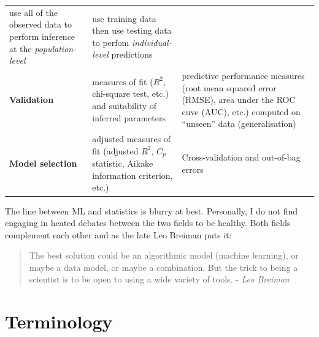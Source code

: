 \documentclass[]{book}
\begin{document}
\begin{longtable}[]{@{}lll@{}}
\begin{minipage}[t]{0.41\columnwidth}
use all of the observed data to perform inference at the \emph{population-level}\strut
\end{minipage} & \begin{minipage}[t]{0.41\columnwidth}\raggedright
use training data then use testing data to perfom \emph{individual-level} predictions\strut
\end{minipage}\tabularnewline
\begin{minipage}[t]{0.10\columnwidth}\raggedright
\textbf{Validation}\strut
\end{minipage} & \begin{minipage}[t]{0.41\columnwidth}\raggedright
measures of fit (\(R^2\), chi-square test, etc.) and suitability of inferred parameters\strut
\end{minipage} & \begin{minipage}[t]{0.41\columnwidth}\raggedright
predictive performance measures (root mean squared error (RMSE), area under the ROC cuve (AUC), etc.) computed on ``unseen'' data (generalisation)\strut
\end{minipage}\tabularnewline
\begin{minipage}[t]{0.10\columnwidth}\raggedright
\textbf{Model selection}\strut
\end{minipage} & \begin{minipage}[t]{0.41\columnwidth}\raggedright
adjusted measures of fit (adjusted \(R^2\), \(C_p\) statistic, Aikake information criterion, etc.)\strut
\end{minipage} & \begin{minipage}[t]{0.41\columnwidth}\raggedright
Cross-validation and out-of-bag errors\strut
\end{minipage}\tabularnewline
\bottomrule
\end{longtable}

The line between ML and statistics is blurry at best. Personally, I do not find engaging in heated debates
between the two fields to be healthy. Both fields complement each other and as the late Leo Breiman puts it:

\begin{quote}
The best solution could be an algorithmic model (machine learning), or maybe a data model,
or maybe a combination. But the trick to being a scientist is to be open to using a wide variety of tools. - \emph{Leo Breiman}
\end{quote}

\hypertarget{terminology}{%
\section{Terminology}\label{terminology}}
\end{document}
